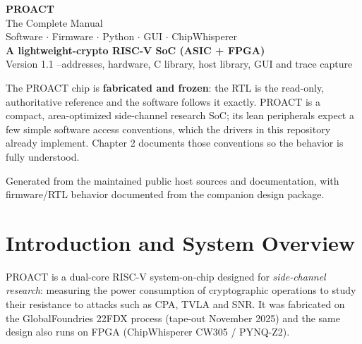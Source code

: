 \documentclass[11pt,a4paper]{report}
\begin{document}
\begin{titlepage}\centering
{}
\vspace*{1.2cm}
{\color{white}\Huge\bfseries PROACT}\\[6pt]
{\color{white!85}\Large The Complete Manual}\\[4pt]
{\color{pblue!40}\large Software $\cdot$ Firmware $\cdot$ Python $\cdot$ GUI $\cdot$ ChipWhisperer}\\[5cm]
{\Large\bfseries A lightweight-crypto RISC-V SoC (ASIC + FPGA)}\\[3pt]
{\large Version 1.1 \quad--\quad addresses, hardware, C library, host library, GUI and trace capture}\\[1.4cm]
\begin{danger}
The PROACT chip is \textbf{fabricated and frozen}: the RTL is the read-only,
authoritative reference and the software follows it exactly. PROACT is a compact,
area-optimized side-channel research SoC; its lean peripherals expect a few simple
software access conventions, which the drivers in this repository already implement.
Chapter 2 documents those conventions so the behavior is fully understood.
\end{danger}
\vfill
{\small Generated from the maintained public host sources and documentation,
with firmware/RTL behavior documented from the companion design package.}
\end{titlepage}

\tableofcontents

\chapter{Introduction and System Overview}
PROACT is a dual-core RISC-V system-on-chip designed for \emph{side-channel
research}: measuring the power consumption of cryptographic operations to study
their resistance to attacks such as CPA, TVLA and SNR. It was fabricated on the
GlobalFoundries 22FDX process (tape-out November 2025) and the same design also
runs on FPGA (ChipWhisperer CW305 / PYNQ-Z2).
\end{document}
